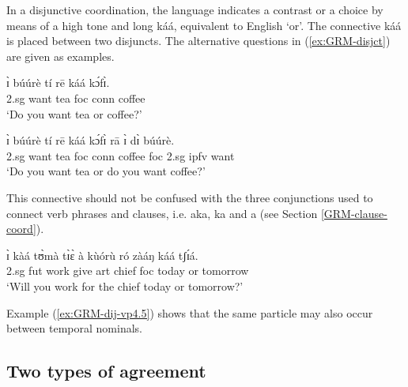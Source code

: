 \begin{exe}
\begin{exe}
\begin{exe}
{\begin{exe}
\begin{exe}
\begin{exe}
\begin{exe}
\begin{exe}
\begin{exe}
\begin{exe}
\begin{exe}
\begin{exe}
\begin{exe}
\begin{exe}
\begin{exe}
\begin{exe}
\begin{exe}
\begin{exe}
\begin{exe}
\begin{exe}
\begin{exe}
In a disjunctive coordination, the language indicates a
contrast or a choice by means of a high tone and long {\sls káá}, 
equivalent
to 
English `or'. 
The connective {\sls káá}  is  placed between  two disjuncts. The alternative questions in 
(\ref{ex:GRM-disjct}) are given as examples.

\ea\label{ex:GRM-disjct}
\ea\label{ex:GRM-disjct-1}

\gll ɪ̀ búúrè tí rē káá kɔ́fɪ̀.\\
  {\sc 2.sg} want tea {\sc foc} {\sc conn} coffee\\
\glt  `Do you want tea or coffee?' 

\ex\label{ex:GRM-disjct-2}

\gll ɪ̀ búúrè tí rē káá kɔ́fɪ̀ rā ɪ̀ dɪ̀ búúrè.\\
  {\sc 2.sg} want tea {\sc foc} {\sc conn} coffee {\sc foc} {\sc 2.sg}
{\sc ipfv} want\\
\glt  `Do you want tea or do you want coffee?' 

\z 
 \z



This  connective
 should not be confused with the three conjunctions used to connect verb
phrases and clauses, i.e. {\sls aka}, {\sls ka} and {\sls a} (see Section
\ref{GRM-clause-coord}).   



\ea\label{ex:GRM-dij-vp4.5}

\gll ɪ̀ kàá tʊ̀mà tɪ̀ɛ̀ à kùórù ró zàáŋ káá tʃɪ́á.\\
  {\sc 2.sg} {\sc fut} work give {\sc art} chief  {\sc foc} today or
tomorrow\\
\glt  `Will you work for the chief today or tomorrow?' 
\z



Example (\ref{ex:GRM-dij-vp4.5}) shows that the same
particle may also occur between
 temporal nominals. 





\subsection{Two types of agreement}
\label{sec:GRM-agrrement}


\end{exe}
\end{exe}
\end{exe}
\end{exe}
\end{exe}
\end{exe}
\end{exe}
\end{exe}
\end{exe}
\end{exe}
\end{exe}
\end{exe}
\end{exe}
\end{exe}
\end{exe}
\end{exe}
\end{exe}
\end{exe}}
\end{exe}
\end{exe}
\end{exe}
